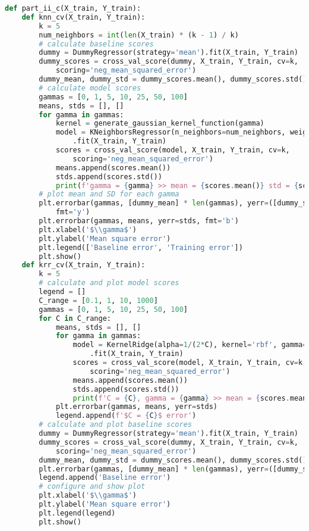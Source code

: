 \documentclass[12pt]{article}
\begin{document}
\begin{lstlisting}[language=Python]
def part_ii_c(X_train, Y_train):
    def knn_cv(X_train, Y_train):
        k = 5
        num_neighbors = int(len(X_train) * (k - 1) / k)
        # calculate baseline scores
        dummy = DummyRegressor(strategy='mean').fit(X_train, Y_train)
        dummy_scores = cross_val_score(dummy, X_train, Y_train, cv=k,
            scoring='neg_mean_squared_error')
        dummy_mean, dummy_std = dummy_scores.mean(), dummy_scores.std()
        # calculate model scores
        gammas = [0, 1, 5, 10, 25, 50, 100]
        means, stds = [], []
        for gamma in gammas:
            kernel = generate_gaussian_kernel_function(gamma)
            model = KNeighborsRegressor(n_neighbors=num_neighbors, weights=kernel)
                .fit(X_train, Y_train)
            scores = cross_val_score(model, X_train, Y_train, cv=k,
                scoring='neg_mean_squared_error')
            means.append(scores.mean())
            stds.append(scores.std())
            print(f'gamma = {gamma} >> mean = {scores.mean()} std = {scores.std()}')
        # plot mean and SD for each gamma
        plt.errorbar(gammas, [dummy_mean] * len(gammas), yerr=([dummy_std] * len(gammas)),
            fmt='y')
        plt.errorbar(gammas, means, yerr=stds, fmt='b')
        plt.xlabel('$\\gamma$')
        plt.ylabel('Mean square error')
        plt.legend(['Baseline error', 'Training error'])
        plt.show()
    def krr_cv(X_train, Y_train):
        k = 5
        # calculate and plot model scores
        legend = []
        C_range = [0.1, 1, 10, 1000]
        gammas = [0, 1, 5, 10, 25, 50, 100]
        for C in C_range:
            means, stds = [], []
            for gamma in gammas:
                model = KernelRidge(alpha=1/(2*C), kernel='rbf', gamma=gamma)
                    .fit(X_train, Y_train)
                scores = cross_val_score(model, X_train, Y_train, cv=k,
                    scoring='neg_mean_squared_error')
                means.append(scores.mean())
                stds.append(scores.std())
                print(f'C = {C}, gamma = {gamma} >> mean = {scores.mean()} std = {scores.std()}')
            plt.errorbar(gammas, means, yerr=stds)
            legend.append(f'$C = {C}$ error')
        # calculate and plot baseline scores
        dummy = DummyRegressor(strategy='mean').fit(X_train, Y_train)
        dummy_scores = cross_val_score(dummy, X_train, Y_train, cv=k,
            scoring='neg_mean_squared_error')
        dummy_mean, dummy_std = dummy_scores.mean(), dummy_scores.std()
        plt.errorbar(gammas, [dummy_mean] * len(gammas), yerr=([dummy_std] * len(gammas)))
        legend.append('Baseline error')
        # configure and show plot
        plt.xlabel('$\\gamma$')
        plt.ylabel('Mean square error')
        plt.legend(legend)
        plt.show()
    

\end{lstlisting}
\end{document}
